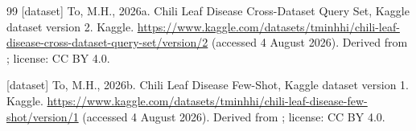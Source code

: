 \begin{thebibliography}{99}
{[}dataset{]} To, M.H., 2026a. Chili Leaf Disease Cross-Dataset Query Set, Kaggle dataset version 2. Kaggle. \url{https://www.kaggle.com/datasets/tminhhi/chili-leaf-disease-cross-dataset-query-set/version/2} (accessed 4 August 2026). Derived from \cite{nirob2025}; license: CC BY 4.0.

{[}dataset{]} To, M.H., 2026b. Chili Leaf Disease Few-Shot, Kaggle dataset version 1. Kaggle. \url{https://www.kaggle.com/datasets/tminhhi/chili-leaf-disease-few-shot/version/1} (accessed 4 August 2026). Derived from \cite{nirob2025}; license: CC BY 4.0.

\end{thebibliography}
